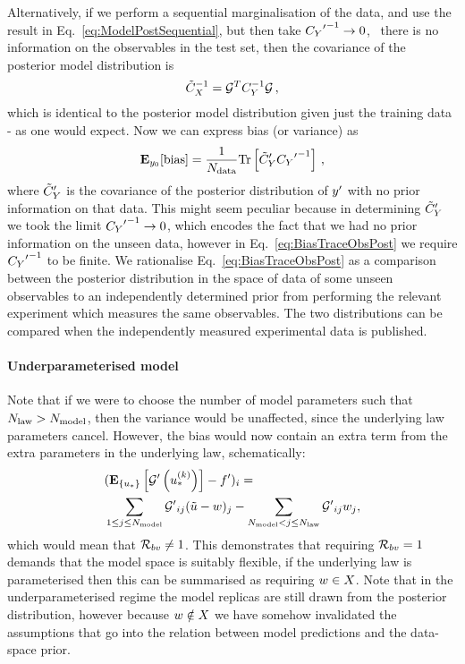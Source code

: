 Alternatively, if we perform a sequential marginalisation of the data, and use
the result in Eq.~\ref{eq:ModelPostSequential}, but then take
${{C_{Y}}^{\prime}}^{-1} \to 0$, \ie\ there is no information on the
observables in the test set, then the covariance of the posterior model
distribution is 
\begin{equation}
    \tilde{C}_X^{-1} = \mathcal{G}^T C_{Y}^{-1} \mathcal{G} \, ,
\end{equation}
which is identical to the posterior model distribution given just the training
data - as one would expect. Now we can express bias (or variance) as
\begin{equation}\label{eq:BiasTraceObsPost}
    \mathbf{E}_{y_0}[{\rm bias}] = \frac{1}{N_{\rm data}}
    {\rm Tr} \left[
        {{\tilde{C}_Y}^{\prime}}
        {{C_{Y}}^{\prime}}^{-1}
    \right] \, ,
\end{equation}
where ${{\tilde{C}_Y}^{\prime}}$ is the covariance of the posterior distribution of
${{y}^{\prime}}$ with no prior information on that data. This might seem
peculiar because in determining ${{\tilde{C}_Y}^{\prime}}$ we took the limit
${{C_{Y}}^{\prime}}^{-1} \to 0$, which encodes the fact that we had no prior
information on the unseen data, however in Eq.~\ref{eq:BiasTraceObsPost} we
require ${{C_{Y}}^{\prime}}^{-1}$ to be finite. We rationalise
Eq.~\ref{eq:BiasTraceObsPost} as a comparison between the posterior distribution
in the space of data of some unseen observables to an independently determined
prior from performing the relevant experiment which measures the same
observables. The two distributions can be compared when the independently
measured experimental data is published.


\paragraph{Underparameterised model}

Note that if we were to choose the number of model parameters such that $N_{\rm law} >
N_{\rm model}$, then the variance would be unaffected, since the underlying law
parameters cancel. However, the bias would now contain an extra term from the
extra parameters in the underlying law, schematically:
\begin{align}
        &(\mathbf{E}_{\{ u_* \}} \left[ {{\mathcal{G}}^{\prime}}\left(u_*^{(k)}\right) \right] - {{f}^{\prime}})_i = \nonumber \\
        &\sum_{1 \leq j \leq N_{\rm model}} {{\mathcal{G}}^{\prime}}_{ij} (\tilde{u} - w)_j -
        \sum_{N_{\rm model} < j \leq N_{\rm law}} {{\mathcal{G}}^{\prime}}_{ij} w_j,
\end{align}
which would mean that $\mathcal{R}_{bv} \neq 1$. This demonstrates that requiring
$\mathcal{R}_{bv} = 1$ demands that the model space is suitably flexible, if the
underlying law is parameterised then this can be summarised as requiring
$w \in X$. Note that in the underparameterised regime the
model replicas are still drawn from the posterior distribution, however because
$w \notin X$ we have somehow invalidated the assumptions that
go into the relation between model predictions and the data-space prior.

